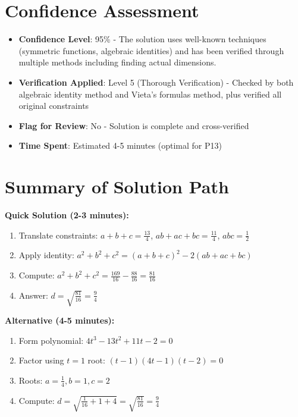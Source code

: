 \documentclass[12pt]{article}
\begin{document}
\section*{Confidence Assessment}
\begin{itemize}[leftmargin=*]
    \item \textbf{Confidence Level}: 95\% - The solution uses well-known techniques (symmetric functions, algebraic identities) and has been verified through multiple methods including finding actual dimensions.
    \item \textbf{Verification Applied}: Level 5 (Thorough Verification) - Checked by both algebraic identity method and Vieta's formulas method, plus verified all original constraints
    \item \textbf{Flag for Review}: No - Solution is complete and cross-verified
    \item \textbf{Time Spent}: Estimated 4-5 minutes (optimal for P13)
\end{itemize}

\section*{Summary of Solution Path}

\textbf{Quick Solution (2-3 minutes):}
\begin{enumerate}
    \item Translate constraints: $a+b+c = \frac{13}{4}$, $ab+ac+bc = \frac{11}{4}$, $abc = \frac{1}{2}$
    \item Apply identity: $a^2+b^2+c^2 = (a+b+c)^2 - 2(ab+ac+bc)$
    \item Compute: $a^2+b^2+c^2 = \frac{169}{16} - \frac{88}{16} = \frac{81}{16}$
    \item Answer: $d = \sqrt{\frac{81}{16}} = \frac{9}{4}$
\end{enumerate}

\textbf{Alternative (4-5 minutes):}
\begin{enumerate}
    \item Form polynomial: $4t^3 - 13t^2 + 11t - 2 = 0$
    \item Factor using $t=1$ root: $(t-1)(4t-1)(t-2) = 0$
    \item Roots: $a=\frac{1}{4}, b=1, c=2$
    \item Compute: $d = \sqrt{\frac{1}{16}+1+4} = \sqrt{\frac{81}{16}} = \frac{9}{4}$
\end{enumerate}
\end{document}
